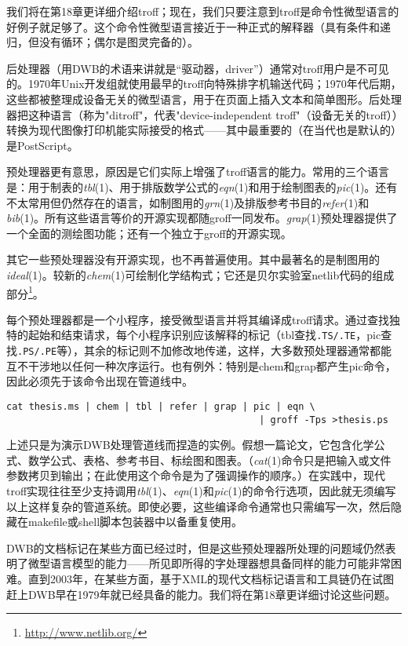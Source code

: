 \documentclass[12pt,oneside]{book}
\begin{document}
\begin{common-format}
我们将在第18章更详细介绍troff；现在，我们只要注意到troff是命令性微型语言的好例子就足够了。这个命令性微型语言接近于一种正式的解释器（具有条件和递归，但没有循环；偶尔是图灵完备的）。

后处理器（用DWB的术语来讲就是“驱动器，driver”）通常对troff用户是不可见的。1970年Unix开发组就使用最早的troff向特殊排字机输送代码；1970年代后期，这些都被整理成设备无关的微型语言，用于在页面上插入文本和简单图形。后处理器把这种语言（称为"ditroff"，代表"device-independent troff"（设备无关的troff））转换为现代图像打印机能实际接受的格式——其中最重要的（在当代也是默认的）是PostScript。

预处理器更有意思，原因是它们实际上增强了troff语言的能力。常用的三个语言是：用于制表的\textit{tbl}(1)、用于排版数学公式的\textit{eqn}(1)和用于绘制图表的\textit{pic}(1)。还有不太常用但仍然存在的语言，如制图用的\textit{grn}(1)及排版参考书目的\textit{refer}(1)和\textit{bib}(1)。所有这些语言等价的开源实现都随groff一同发布。\textit{grap}(1)预处理器提供了一个全面的测绘图功能；还有一个独立于groff的开源实现。

其它一些预处理器没有开源实现，也不再普遍使用。其中最著名的是制图用的\textit{ideal}(1)。较新的\textit{chem}(1)可绘制化学结构式；它还是贝尔实验室netlib代码的组成部分\footnote{\href{http://www.netlib.org/}{http://www.netlib.org/}}。

每个预处理器都是一个小程序，接受微型语言并将其编译成troff请求。通过查找独特的起始和结束请求，每个小程序识别应该解释的标记（tbl查找\verb+.TS/.TE+，pic查找\verb+.PS/.PE+等），其余的标记则不加修改地传递，这样，大多数预处理器通常都能互不干涉地以任何一种次序运行。也有例外：特别是chem和grap都产生pic命令，因此必须先于该命令出现在管道线中。

\begin{Verbatim}
cat thesis.ms | chem | tbl | refer | grap | pic | eqn \
                                             | groff -Tps >thesis.ps
\end{Verbatim}

上述只是为演示DWB处理管道线而捏造的实例。假想一篇论文，它包含化学公式、数学公式、表格、参考书目、标绘图和图表。（\textit{cat}(1)命令只是把输入或文件参数拷贝到输出；在此使用这个命令是为了强调操作的顺序。）在实践中，现代troff实现往往至少支持调用\textit{tbl}(1)、\textit{eqn}(1)和\textit{pic}(1)的命令行选项，因此就无须编写以上这样复杂的管道系统。即使必要，这些编译命令通常也只需编写一次，然后隐藏在makefile或shell脚本包装器中以备重复使用。

DWB的文档标记在某些方面已经过时，但是这些预处理器所处理的问题域仍然表明了微型语言模型的能力——所见即所得的字处理器想具备同样的能力可能非常困难。直到2003年，在某些方面，基于XML的现代文档标记语言和工具链仍在试图赶上DWB早在1979年就已经具备的能力。我们将在第18章更详细讨论这些问题。


\end{common-format}
\end{document}
